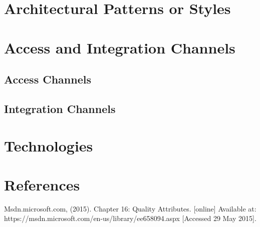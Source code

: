 \documentclass[11pt,a4paper,titlepage]{article}
\begin{document}
	
\section{Architectural Patterns or Styles}
	

\section{Access and Integration Channels}
\subsection{Access Channels}
	
\subsection{Integration Channels}
	
	
\section{Technologies}



\section{References}
\begin{thebibliography}{99}
	 Msdn.microsoft.com, (2015). Chapter 16: Quality Attributes. [online] Available at: https://msdn.microsoft.com/en-us/library/ee658094.aspx [Accessed 29 May 2015].
	
\end{thebibliography}
\end{document}
